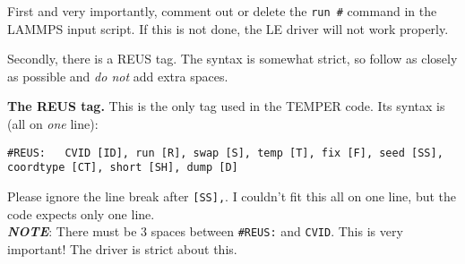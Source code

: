 \documentclass[10pt]{article}
\begin{document}
First and very importantly, comment out
or delete the \texttt{run \#} command in the LAMMPS input script. If this is not done,
the LE driver will not work properly. 

Secondly, there is a REUS tag. The syntax is somewhat strict,
so follow as closely as possible and {\em do not} add extra spaces.

\textbf{The REUS tag.} This is the only tag used in the TEMPER code. Its syntax is (all on {\em one} line):
\begin{verbatim}
#REUS:   CVID [ID], run [R], swap [S], temp [T], fix [F], seed [SS], 
coordtype [CT], short [SH], dump [D]
\end{verbatim}
Please ignore the line break after \texttt{[SS],}. I couldn't fit this all on one line, but the code expects only one line.\\
\textbf{\em NOTE}: There must be 3 spaces between \texttt{\#REUS:} and \texttt{CVID}. This is very important! The
driver is strict about this.\\
\end{document}
